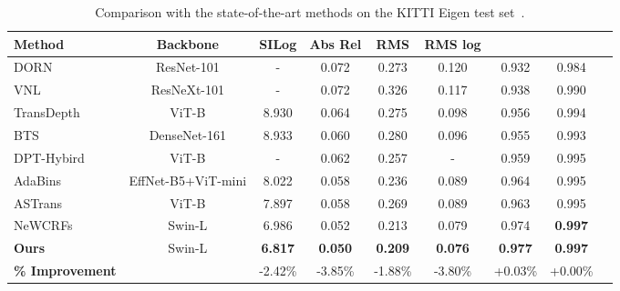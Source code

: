 \documentclass{article} \usepackage{iclr2023_conference, times}
\begin{document}
\begin{table}
\begin{center}
\scriptsize
\caption{\small Comparison with the state-of-the-art methods on the KITTI Eigen test set~\citep{eigen2014depth}. }
\label{tab:eigen_sota}
\setlength\tabcolsep{5.5pt}
\begin{tabular*}{1.0\textwidth}{l@{\extracolsep{\fill}}cccccccc}
\hline
Method & Backbone& SILog  & Abs Rel & RMS & RMS log &    &   \\
\hline
DORN~\citep{fu2018deep} &ResNet-101 & - & 0.072 & 0.273 & 0.120 & 0.932 & 0.984 \\
VNL~\citep{yin2019enforcing} & ResNeXt-101& - & 0.072 & 0.326 & 0.117 & 0.938 & 0.990 \\
TransDepth~\citep{yang2021transformer} & ViT-B & 8.930 & 0.064 & 0.275 & 0.098 & 0.956 & 0.994 \\
BTS~\citep{lee2019big} &DenseNet-161 & 8.933 & 0.060 & 0.280 & 0.096 & 0.955 & 0.993 \\
DPT-Hybird~\citep{ranftl2021vision} & ViT-B& - & 0.062 & 0.257 & - & 0.959 & 0.995 \\
AdaBins~\citep{bhat2021adabins} &EffNet-B5+ViT-mini & 8.022 & 0.058 & 0.236 & 0.089 & 0.964 & 0.995 \\
ASTrans~\citep{chang2021transformer} & ViT-B & 7.897 & 0.058 & 0.269 & 0.089 & 0.963 & 0.995 \\
NeWCRFs~\citep{yuan2022new} & Swin-L & 6.986 & 0.052 & 0.213 & 0.079 & 0.974 & \textbf{0.997} \\
\hline
\textbf{Ours} & Swin-L& \textbf{6.817}  & \textbf{0.050} & \textbf{0.209} & \textbf{0.076} & \textbf{0.977} & \textbf{0.997}\\
\textbf{\% Improvement} & & \textcolor{ao}{-2.42\%} & \textcolor{ao}{-3.85\%} & \textcolor{ao}{-1.88\%} & \textcolor{ao}{-3.80\%} & \textcolor{ao}{+0.03\%} & \textcolor{ao}{+0.00\%} \\
\hline
\end{tabular*}
\end{center}
\end{table}
\end{document}
